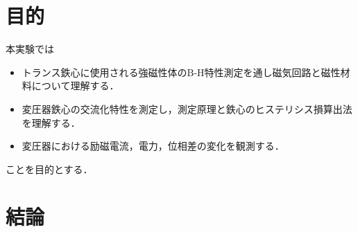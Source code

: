 \documentclass[11pt,dvipdfmx]{ujarticle}
\begin{document}
\begin{jikkenTitle}
 \subTitle{} 
 \kyoudouII{} 
 \yoteibiIII{}
\end{jikkenTitle}

\section{目的}
本実験では
\begin{itemize}
	\item トランス鉄心に使用される強磁性体のB-H特性測定を通し磁気回路と磁性材料について理解する．
	\item 変圧器鉄心の交流化特性を測定し，測定原理と鉄心のヒステリシス損算出法を理解する．
	\item 変圧器における励磁電流，電力，位相差の変化を観測する．
\end{itemize}
ことを目的とする．






\clearpage
\section{結論}

\newpage
\end{document}
